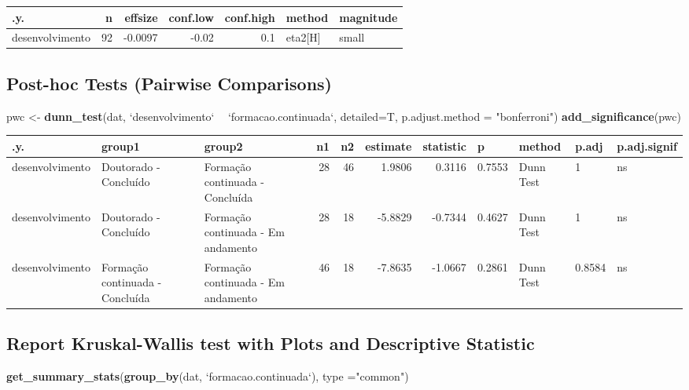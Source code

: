 \documentclass[]{article}
\newenvironment{Shaded}{\begin{snugshade}}{\end{snugshade}}
\newcommand{\DataTypeTok}[1]{\textcolor[rgb]{0.13,0.29,0.53}{#1}}
\newcommand{\KeywordTok}[1]{\textcolor[rgb]{0.13,0.29,0.53}{\textbf{#1}}}
\newcommand{\NormalTok}[1]{#1}
\newcommand{\OperatorTok}[1]{\textcolor[rgb]{0.81,0.36,0.00}{\textbf{#1}}}
\newcommand{\StringTok}[1]{\textcolor[rgb]{0.31,0.60,0.02}{#1}}
\begin{document}
\begin{longtable}[]{@{}lrrrrll@{}}
\toprule
.y. & n & effsize & conf.low & conf.high & method &
magnitude\tabularnewline
\midrule
\endhead
desenvolvimento & 92 & -0.0097 & -0.02 & 0.1 & eta2{[}H{]} &
small\tabularnewline
\bottomrule
\end{longtable}

\hypertarget{post-hoc-tests-pairwise-comparisons}{%
\subsection{Post-hoc Tests (Pairwise
Comparisons)}\label{post-hoc-tests-pairwise-comparisons}}

\begin{Shaded}
\begin{Highlighting}[]
\NormalTok{pwc <-}\StringTok{ }\KeywordTok{dunn_test}\NormalTok{(dat, }\StringTok{`}\DataTypeTok{desenvolvimento}\StringTok{`} \OperatorTok{~}\StringTok{ `}\DataTypeTok{formacao.continuada}\StringTok{`}\NormalTok{, }\DataTypeTok{detailed=}\NormalTok{T, }\DataTypeTok{p.adjust.method =} \StringTok{"bonferroni"}\NormalTok{)}
\KeywordTok{add_significance}\NormalTok{(pwc)}
\end{Highlighting}
\end{Shaded}

\begin{longtable}[]{@{}lllrrrrllll@{}}
\toprule
.y. & group1 & group2 & n1 & n2 & estimate & statistic & p & method &
p.adj & p.adj.signif\tabularnewline
\midrule
\endhead
desenvolvimento & Doutorado - Concluído & Formação continuada -
Concluída & 28 & 46 & 1.9806 & 0.3116 & 0.7553 & Dunn Test & 1 &
ns\tabularnewline
desenvolvimento & Doutorado - Concluído & Formação continuada - Em
andamento & 28 & 18 & -5.8829 & -0.7344 & 0.4627 & Dunn Test & 1 &
ns\tabularnewline
desenvolvimento & Formação continuada - Concluída & Formação continuada
- Em andamento & 46 & 18 & -7.8635 & -1.0667 & 0.2861 & Dunn Test &
0.8584 & ns\tabularnewline
\bottomrule
\end{longtable}

\hypertarget{report-kruskal-wallis-test-with-plots-and-descriptive-statistic}{%
\subsection{Report Kruskal-Wallis test with Plots and Descriptive
Statistic}\label{report-kruskal-wallis-test-with-plots-and-descriptive-statistic}}

\begin{Shaded}
\begin{Highlighting}[]
\KeywordTok{get_summary_stats}\NormalTok{(}\KeywordTok{group_by}\NormalTok{(dat, }\StringTok{`}\DataTypeTok{formacao.continuada}\StringTok{`}\NormalTok{), }\DataTypeTok{type =}\StringTok{"common"}\NormalTok{)}
\end{Highlighting}
\end{Shaded}
\end{document}
